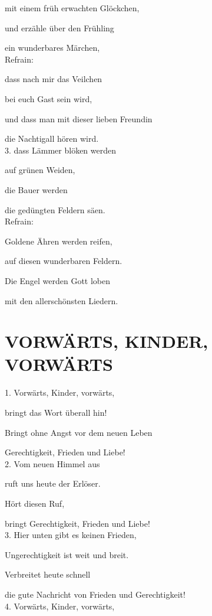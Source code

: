 \documentclass[11pt,a5paper,twoside]{article}
\begin{document}
mit einem früh erwachten Glöckchen,

und erzähle über den Frühling

ein wunderbares Märchen,\\

Refrain:

dass nach mir das Veilchen

bei euch Gast sein wird, 

und dass man mit dieser lieben Freundin

die Nachtigall hören wird.\\

3. dass Lämmer blöken werden

auf grünen Weiden, 

die Bauer werden 

die gedüngten Feldern säen. \\

Refrain:

Goldene Ähren werden reifen,

auf diesen wunderbaren Feldern. 

Die Engel werden Gott loben 

mit den allerschönsten Liedern.

\section[Vorwärts, Kinder, Vorwärts]{VORWÄRTS, KINDER, VORWÄRTS}

1. Vorwärts, Kinder, vorwärts,

bringt das Wort überall hin! 

Bringt ohne Angst vor dem neuen Leben 

Gerechtigkeit, Frieden und Liebe!\\

2. Vom neuen Himmel aus

ruft uns heute der Erlöser.

Hört diesen Ruf, 

bringt Gerechtigkeit, Frieden und Liebe!\\

3. Hier unten gibt es keinen Frieden, 

Ungerechtigkeit ist weit und breit.

Verbreitet heute schnell 

die gute Nachricht von Frieden und Gerechtigkeit!\\

4. Vorwärts, Kinder, vorwärts,
\end{document}
